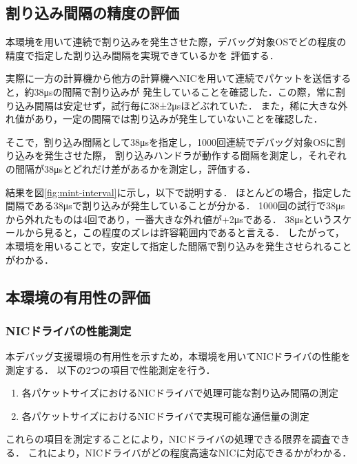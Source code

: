 \documentclass[submit,techreq,noauthor,dvipdfmx]{ipsj}
\begin{document}
\subsection{割り込み間隔の精度の評価}\label{sec:interval}


本環境を用いて連続で割り込みを発生させた際，デバッグ対象OSでどの程度の精度で指定した割り込み間隔を実現できているかを
評価する．

実際に一方の計算機から他方の計算機へNICを用いて連続でパケットを送信すると，約38μsの間隔で割り込みが
発生していることを確認した．この際，常に割り込み間隔は安定せず，試行毎に38±2μsほどぶれていた．
また，稀に大きな外れ値があり，一定の間隔では割り込みが発生していないことを確認した．

そこで，割り込み間隔として38μsを指定し，1000回連続でデバッグ対象OSに割り込みを発生させた際，
割り込みハンドラが動作する間隔を測定し，それぞれの間隔が38μsとどれだけ差があるかを測定し，評価する．

結果を図\ref{fig:mint-interval}に示し，以下で説明する．
ほとんどの場合，指定した間隔である38μsで割り込みが発生していることが分かる．
1000回の試行で38μsから外れたものは4回であり，一番大きな外れ値が+2μsである．
38μsというスケールから見ると，この程度のズレは許容範囲内であると言える．
したがって，本環境を用いることで，安定して指定した間隔で割り込みを発生させられることがわかる．

\subsection{本環境の有用性の評価}\label{sec:interval}

\subsubsection{NICドライバの性能測定}\label{sec:interval}

本デバッグ支援環境の有用性を示すため，本環境を用いてNICドライバの性能を測定する．
以下の2つの項目で性能測定を行う．
\begin{enumerate}
    \item 各パケットサイズにおけるNICドライバで処理可能な割り込み間隔の測定
    \item 各パケットサイズにおけるNICドライバで実現可能な通信量の測定
\end{enumerate}
これらの項目を測定することにより，NICドライバの処理できる限界を調査できる．
これにより，NICドライバがどの程度高速なNICに対応できるかがわかる．
\end{document}
